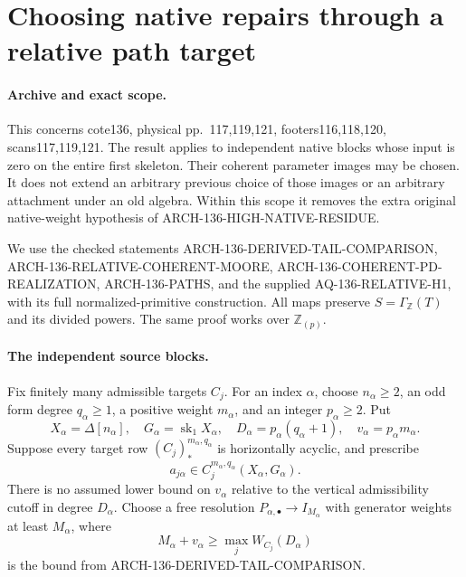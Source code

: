 \section{Choosing native repairs through a relative path target}
\label{sec:136-chosen-native-paths}

\paragraph{Archive and exact scope.}
This concerns cote136, physical pp.~117,119,121, footers116,118,120,
scans117,119,121.  The result applies to independent native blocks
whose input is zero on the entire first skeleton.  Their coherent
parameter images may be chosen.  It does not extend an arbitrary
previous choice of those images or an arbitrary attachment under
an old algebra.  Within this scope it removes the extra original
native-weight hypothesis of ARCH-136-HIGH-NATIVE-RESIDUE.

We use the checked statements ARCH-136-DERIVED-TAIL-COMPARISON,
ARCH-136-RELATIVE-COHERENT-MOORE,
ARCH-136-COHERENT-PD-REALIZATION, ARCH-136-PATHS, and the supplied
AQ-136-RELATIVE-H1, with its full normalized-primitive construction.
All maps preserve \(S=\Gamma_{\mathbb Z}(T)\) and its
divided powers.  The same proof works over \(\mathbb Z_{(p)}\).

\paragraph{The independent source blocks.}
Fix finitely many admissible targets \(C_j\).  For an index
\(\alpha\), choose \(n_\alpha\geq2\), an odd form degree
\(q_\alpha\geq1\), a positive weight \(m_\alpha\), and an
integer \(p_\alpha\geq2\).  Put
\[
 X_\alpha=\Delta[n_\alpha],\quad
 G_\alpha=\operatorname{sk}_1X_\alpha,\quad
 D_\alpha=p_\alpha(q_\alpha+1),\quad
 v_\alpha=p_\alpha m_\alpha.
                                                               \tag{136.CN1}
\]
Suppose every target row \((C_j)_*^{m_\alpha,q_\alpha}\)
is horizontally acyclic, and prescribe
\[
      a_{j\alpha}\in C_j^{m_\alpha,q_\alpha}(X_\alpha,G_\alpha).
                                                               \tag{136.CN2}
\]
There is no assumed lower bound on \(v_\alpha\) relative
to the vertical admissibility cutoff in degree \(D_\alpha\).
Choose a free resolution \(P_{\alpha,\bullet}\to I_{M_\alpha}\)
with generator weights at least \(M_\alpha\), where
\[
 M_\alpha+v_\alpha\geq\max_j W_{C_j}(D_\alpha)
                                                               \tag{136.CN3}
\]
is the bound from ARCH-136-DERIVED-TAIL-COMPARISON.

